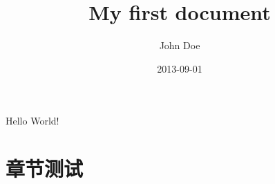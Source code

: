 \documentclass{article}
\title{My first document}
\date{2013-09-01}
\author{John Doe}
\begin{document}
  \maketitle
  \newpage

  Hello World!
  \section{章节测试}
\end{document}
